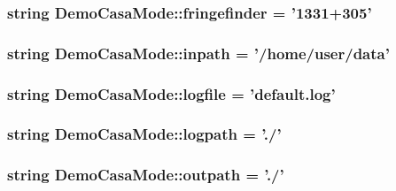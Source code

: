 \hypertarget{namespace_demo_casa_mode_a5a755c946a07f8c5533bbbd9dfe57850}{
\subsubsection[{fringefinder}]{\setlength{\rightskip}{0pt plus 5cm}string {\bf \-Demo\-Casa\-Mode\-::fringefinder} = '1331+305'}}\label{namespace_demo_casa_mode_a5a755c946a07f8c5533bbbd9dfe57850}
\hypertarget{namespace_demo_casa_mode_a4c1241b0cc5a6dc0be40da6f2badb88e}{
\subsubsection[{inpath}]{\setlength{\rightskip}{0pt plus 5cm}string {\bf \-Demo\-Casa\-Mode\-::inpath} = '/home/user/data'}}\label{namespace_demo_casa_mode_a4c1241b0cc5a6dc0be40da6f2badb88e}
\hypertarget{namespace_demo_casa_mode_a6ac19cf6abe399c43b680ca6b263a858}{
\subsubsection[{logfile}]{\setlength{\rightskip}{0pt plus 5cm}string {\bf \-Demo\-Casa\-Mode\-::logfile} = 'default.\-log'}}\label{namespace_demo_casa_mode_a6ac19cf6abe399c43b680ca6b263a858}
\hypertarget{namespace_demo_casa_mode_ae476df9959edb4653640850b3b508a37}{
\subsubsection[{logpath}]{\setlength{\rightskip}{0pt plus 5cm}string {\bf \-Demo\-Casa\-Mode\-::logpath} = './'}}\label{namespace_demo_casa_mode_ae476df9959edb4653640850b3b508a37}
\hypertarget{namespace_demo_casa_mode_a9bbc9c0ab07aabe1e0d807407c544038}{
\subsubsection[{outpath}]{\setlength{\rightskip}{0pt plus 5cm}string {\bf \-Demo\-Casa\-Mode\-::outpath} = './'}}\label{namespace_demo_casa_mode_a9bbc9c0ab07aabe1e0d807407c544038}
